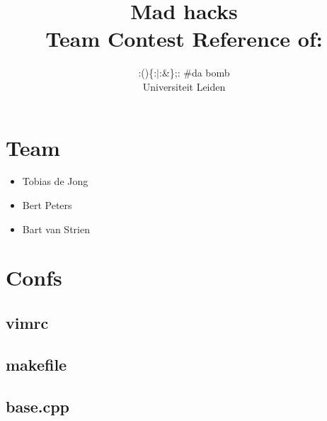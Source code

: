 \documentclass[10pt,hidelinks]{article}
\title{Mad hacks\\[1cm]
\small{Team Contest Reference of:}}
\author{:()\{:$\vert$:\&\};: #da bomb\\[1cm]
	\small{Universiteit Leiden}}
\begin{document}
\fontsize{10}{12}


\maketitle

\newpage

\tableofcontents

\section{Team}
\begin{itemize}
\item Tobias de Jong
\item Bert Peters
\item Bart van Strien
\end{itemize}

\section{Confs}

\subsection{vimrc}


\subsection{makefile}


\lstset{language=c++}

\subsection{base.cpp}

\end{document}
